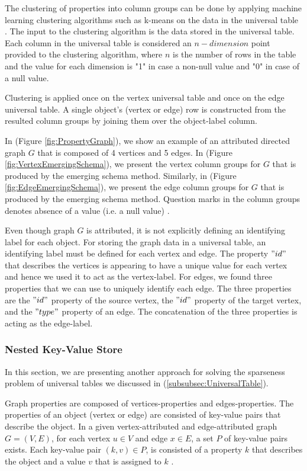 {The clustering of properties into column groups can be done by applying machine learning clustering algorithms such as k-means on the data in the universal table \cite{macqueen1967,Paradies2017}. The input to the clustering algorithm is the data stored in the universal table. Each column in the universal table is considered an $n-dimension$ point provided to the clustering algorithm, where $n$ is the number of rows in the table and the value for each dimension is "1" in case a non-null value and "0" in case of a null value. 

Clustering is applied once on the vertex universal table and once on the edge universal table. A single object's (vertex or edge) row is constructed from the resulted column groups by joining them over the object-label column.

In (Figure \ref{fig:PropertyGraph}), we show an example of an attributed directed graph $G$ that is composed of 4 vertices and 5 edges. In (Figure \ref{fig:VertexEmergingSchema}), we present the vertex column groups for $G$ that is produced by the emerging schema method. Similarly, in (Figure \ref{fig:EdgeEmergingSchema}), we present the edge column groups for $G$ that is produced by the emerging schema method. Question marks in the column groups denotes absence of a value (i.e. a null value) \cite{Paradies2017}. 

Even though graph $G$ is attributed, it is not explicitly defining an identifying label for each object. For storing the graph data in a universal table, an identifying label must be defined for each vertex and edge. The property $"id"$ that describes the vertices is appearing to have a unique value for each vertex and hence we used it to act as the vertex-label. For edges, we found three properties that we can use to uniquely identify each edge. The three properties are the $"id"$ property of the source vertex, the $"id"$ property of the target vertex, and the $"type"$ property of an edge. The concatenation of the three properties is acting as the edge-label.


\subsubsection{Nested Key-Value Store}
\label{subsubsec:NestedkeyValueStore}

In this section, we are presenting another approach for solving the sparseness problem of universal tables we discussed in (\ref{subsubsec:UniversalTable}).

Graph properties are composed of vertices-properties and edges-properties. The properties of an object (vertex or edge) are consisted of key-value pairs that describe the object. In a given vertex-attributed and edge-attributed graph $G = (V,E)$, for each vertex $u \in V$ and edge $x \in E$, a set $P$ of key-value pairs exists. Each key-value pair $(k,v) \in P$, is consisted of a property $k$ that describes the object and a value $v$ that is assigned to $k$ \cite{ladwig2011cumulusrdf}.

}
